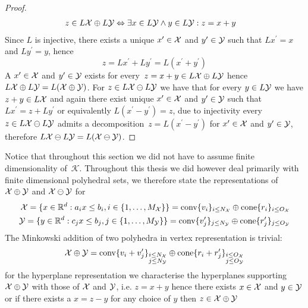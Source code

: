 \begin{proof}
\begin{equation}\begin{aligned}
	z\in L\mathcal X\oplus L\mathcal Y &\Leftrightarrow \exists x\in L\mathcal Y\wedge y\in L\mathcal Y: z = x+y
\end{aligned}\end{equation}
%
Since $L$ is injective, there exists a unique $x^\prime\in\mathcal X$ and $y^\prime\in\mathcal Y$ such that $L x^\prime = x$ and $Ly^\prime = y$, hence
%
\begin{equation}
	z=Lx^\prime+Ly^\prime = L(x^\prime+y^\prime)
\end{equation}
%
A $x^\prime\in\mathcal X$ and $y^\prime\in\mathcal Y$ exists for every~$z=x+y\in L\mathcal X\oplus L\mathcal Y$ hence $L\mathcal X\oplus L\mathcal Y= L(\mathcal X\oplus\mathcal Y)$.
%
For $z\in L\mathcal X\ominus L\mathcal Y$ we have that for every $y\in L\mathcal Y$ we have $z+y\in L\mathcal X$ and again there exist unique $x^\prime\in\mathcal X$ and $y^\prime\in\mathcal Y$ such that $L x^\prime = z+Ly^\prime$ or equivalently $L(x^\prime-y^\prime)=z$, due to injectivity every $z\in L\mathcal X\ominus L\mathcal Y$ admits a decomposition~$z=L(x^\prime-y^\prime)$ for $x^\prime\in\mathcal X$ and $y^\prime\in\mathcal Y$, therefore $L\mathcal X\ominus L\mathcal Y=L(\mathcal X\ominus\mathcal Y)$.
\end{proof}
%
%
\mysplit Notice that throughout this section we did not have to assume finite dimensionality of~$\mathcal K$.
%
Throughout this thesis we did however deal primarily with finite dimensional polyhedral sets, we therefore state the representations of $\mathcal X\oplus\mathcal Y$ and $\mathcal X\ominus\mathcal Y$ for 
%
\begin{equation}\begin{aligned}
	\mathcal X = \{x\in\mathbb R^d: a_ix\leq b_i,i\in\{1,\dots,M_\mathcal X\}\} = \text{conv}\{v_i\}_{i\leq N_\mathcal X}\oplus\text{cone}\{r_i\}_{i\leq O_\mathcal X}\\
	\mathcal Y = \{y\in\mathbb R^d: c_jx\leq b_j,j\in\{1,\dots,M_\mathcal Y\}\}=\text{conv}\{v_j^\prime\}_{j\leq N_\mathcal Y}\oplus\text{cone}\{r_j^\prime\}_{j\leq O_\mathcal Y}
	\end{aligned}
\end{equation}
%
The Minkowski addition of two polyhedra in vertex representation is trivial:
%
\begin{equation}
	\mathcal X\oplus\mathcal Y = \text{conv}\{v_i+v_j^\prime\}_{\substack{i\leq N_\mathcal X\\ j\leq N_\mathcal Y}} \oplus\text{cone}\{r_i+r_j^\prime\}_{\substack{i\leq O_\mathcal X\\ j\leq O_\mathcal Y}}
\end{equation}
%
for the hyperplane representation we characterise the hyperplanes supporting~$\mathcal X\oplus\mathcal Y$ with those of $\mathcal X$ and $\mathcal Y$, i.e. $z=x+y$ hence there exists $x\in\mathcal X$ and $y\in\mathcal Y$ or if there exists a $x=z-y$ for any choice of $y$ then $z\in\mathcal X\oplus\mathcal Y$
